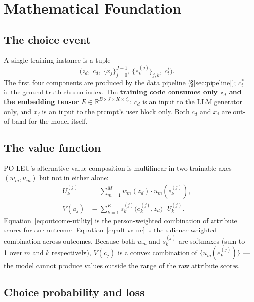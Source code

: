 \documentclass[11pt,a4paper]{article}
\begin{document}
\section{Mathematical Foundation}
\label{sec:math}

\subsection{The choice event}

A single training instance is a tuple
\begin{equation}
  \bigl(z_d,\ c_d,\ \{x_j\}_{j=0}^{J-1},\ \{e_k^{(j)}\}_{j,k},\ c^*_t\bigr).
  \label{eq:tuple}
\end{equation}
The first four components are produced by the data pipeline
(\S\ref{sec:pipeline}); $c^*_t$ is the ground-truth chosen index. The
\textbf{training code consumes only $z_d$ and the embedding tensor}
$E \in \mathbb{R}^{B \times J \times K \times d_e}$: $c_d$ is an
input to the LLM generator only, and $x_j$ is an input to the prompt's
user block only. Both $c_d$ and $x_j$ are out-of-band for the model
itself.

\subsection{The value function}

PO-LEU's alternative-value composition is multilinear in two trainable
axes $(w_m, u_m)$ but not in either alone:
\begin{align}
  U_k^{(j)} &= \sum_{m=1}^{M} w_m(z_d) \cdot u_m(e_k^{(j)}),
  \label{eq:outcome-utility} \\
  V(a_j)  &= \sum_{k=1}^{K} s_k^{(j)}\bigl(e_k^{(j)}, z_d\bigr)
                \cdot U_k^{(j)}.
  \label{eq:alt-value}
\end{align}
Equation~\eqref{eq:outcome-utility} is the person-weighted combination
of attribute scores for one outcome. Equation~\eqref{eq:alt-value} is
the salience-weighted combination across outcomes. Because both
$w_m$ and $s_k^{(j)}$ are softmaxes (sum to 1 over $m$ and $k$
respectively), $V(a_j)$ is a convex combination of
$\{u_m(e_k^{(j)})\}$ — the model cannot produce values outside the
range of the raw attribute scores.

\subsection{Choice probability and loss}
\end{document}
